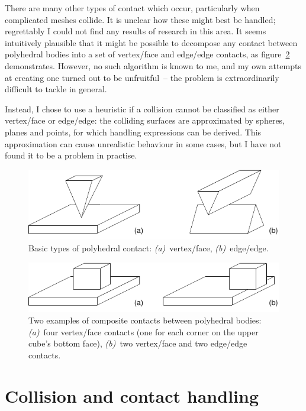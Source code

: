 There are many other types of contact which occur, particularly when complicated meshes
collide. It is unclear how these might best be handled; regrettably I could not find any results
of research in this area. It seems intuitively plausible that it might be possible to decompose any
contact between polyhedral bodies into a set of vertex/face and edge/edge contacts, as
figure~\ref{contacts2Figure} demonstrates. However, no such algorithm is known to me, and my own
attempts at creating one turned out to be unfruitful~-- the problem is extraordinarily difficult
to tackle in general.

Instead, I chose to use a heuristic if a collision cannot be classified as either vertex/face or
edge/edge: the colliding surfaces are approximated by spheres, planes and points, for which
handling expressions can be derived. This approximation can cause unrealistic behaviour in some
cases, but I have not found it to be a problem in practise.

\begin{figure}
\centerline{\includegraphics{figures/contacts1}}
\caption{Basic types of polyhedral contact: \emph{(a)}~vertex/face, \emph{(b)}~edge/edge.
    \label{contacts1Figure}}
\end{figure}

\begin{figure}
\centerline{\includegraphics{figures/contacts2}}
\caption{Two examples of composite contacts between polyhedral bodies:
    \emph{(a)}~four vertex/face contacts (one for each corner on the upper cube's bottom face),
    \emph{(b)}~two vertex/face and two edge/edge contacts.
    \label{contacts2Figure}}
\end{figure}


\section{Collision and contact handling\label{collisionHandling}}

